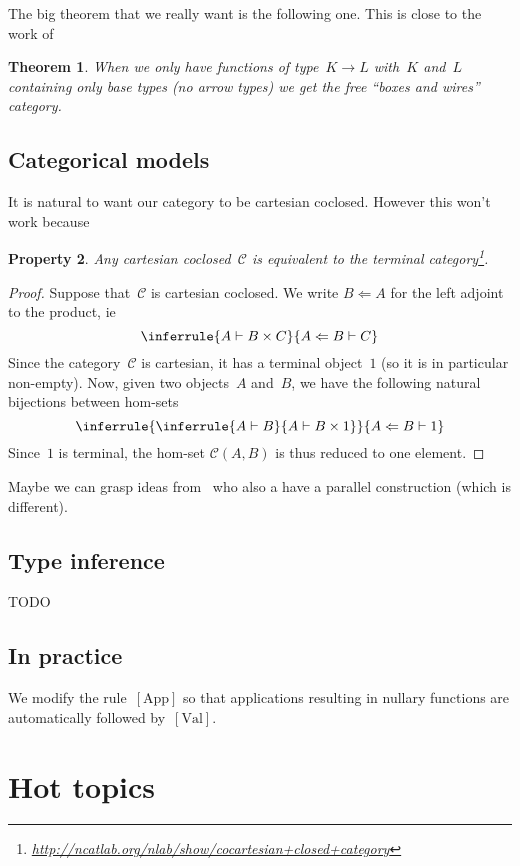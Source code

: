 \documentclass[a4paper,titlepage]{article}
\newcommand{\oT}{\Leftarrow}
\newcommand{\regle}[1]{\mathrm{[#1]}}
\newtheorem{theorem}{Theorem}
\newtheorem{property}[theorem]{Property}
\renewcommand{\C}{\mathcal{C}}
\begin{document}
The big theorem that we really want is the following one. This is close to the work of~\cite{hasegawa:sharing-graphs}
\begin{theorem}
  When we only have functions of type~$K\to L$ with~$K$ and~$L$ containing only
  base types (no arrow types) we get the free ``boxes and wires'' category.
\end{theorem}

\subsection{Categorical models}
It is natural to want our category to be cartesian coclosed. However this won't
work because
\begin{property}
  Any cartesian coclosed~$\C$ is equivalent to the terminal
  category\footnote{\url{http://ncatlab.org/nlab/show/cocartesian+closed+category}}.
\end{property}
\begin{proof}
  Suppose that~$\C$ is cartesian coclosed. We write $B\oT A$ for the left
  adjoint to the product, ie
  \[
  \inferrule
  {A\vdash B\times C}
  {A\oT B\vdash C}
  \]
  Since the category~$\C$ is cartesian, it has a terminal object~$1$ (so it is
  in particular non-empty). Now, given two objects~$A$ and~$B$, we have the
  following natural bijections between hom-sets
  \[
  \inferrule{
    \inferrule{
      A\vdash B
    }
    {A\vdash B\times 1}
  }
  {A\oT B\vdash 1}
  \]
  Since~$1$ is terminal, the hom-set $\C(A,B)$ is thus reduced to one element.
\end{proof}

Maybe we can grasp ideas from~\cite{faure-miquel:cat-par-lambda} who also a have
a parallel construction (which is different).

\subsection{Type inference}
TODO

\subsection{In practice}
We modify the rule~$\regle{App}$ so that applications resulting in nullary
functions are automatically followed by~$\regle{Val}$.

\section{Hot topics}
\end{document}
